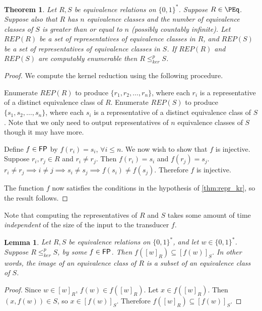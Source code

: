 \documentclass{article}
\newtheorem{theorem}{Theorem}[section]
\newtheorem{lemma}[lemma]{Lemma}
\theoremstyle{definition} \newtheorem{definition}[definition]{Definition}
\newcommand{\sigmastar}{\{0, 1\}^{*}} %
\newcommand{\kr}{\leq^{p}_{ker}} %
\begin{document}
\begin{theorem}\label{thm:reps}
  Let $R,S$ be equivalence relations on $\sigmastar$. Suppose
  $R\in\PEq$. Suppose also that $R$ has $n$ equivalence classes and the number
  of equivalence classes of $S$ is greater than or equal to $n$ (possibly
  countably infinite). Let $REP(R)$ be a set of representatives of equivalence
  classes in $R$, and $REP(S)$ be a set of representatives of equivalence
  classes in $S$. If $REP(R)$ and $REP(S)$ are computably enumerable then $R\kr
  S$.
\end{theorem}
\begin{proof}
  We compute the kernel reduction using the following procedure.

  Enumerate $REP(R)$ to produce $\{r_1, r_2, \ldots, r_n\}$, where each $r_i$
  is a representative of a distinct equivalence class of $R$. Enumerate
  $REP(S)$ to produce $\{s_1, s_2, \ldots, s_n\}$, where each $s_i$ is a
  representative of a distinct equivalence class of $S$. Note that we only need
  to output representatives of $n$ equivalence classes of $S$ though it may
  have more.

  Define $f\in{\ensuremath{\mathsf{FP}}}$ by $f(r_i)=s_i$, $\forall i\leq n$. We now wish to show that
  $f$ is injective. Suppose $r_i,r_j\in R$ and $r_i\neq r_j$. Then $f(r_i)=s_i$
  and $f(r_j)=s_j$. $r_i\neq r_j\implies i\neq j\implies s_i\neq s_j\implies
  f(s_i)\neq f(s_j)$. Therefore $f$ is injective.

  The function $f$ now satisfies the conditions in the hypothesis of
  \autoref{thm:repr_kr}, so the result follows.
\end{proof}

Note that computing the representatives of $R$ and $S$ takes some amount of
time \emph{independent} of the size of the input to the transducer $f$.

\begin{lemma}\label{lem:image}
  Let $R,S$ be equivalence relations on $\sigmastar$, and let
  $w\in\sigmastar$. Suppose $R\kr S$, by some $f\in{\ensuremath{\mathsf{FP}}}$. Then
  $f([w]_R)\subseteq [f(w)]_S$. In other words, the image of an equivalence
  class of $R$ is a subset of an equivalence class of $S$.
\end{lemma}
\begin{proof}
  Since $w\in [w]_R$, $f(w)\in f([w]_R)$. Let $x\in f([w]_R)$. Then $(x,
  f(w))\in S$, so $x\in [f(w)]_S$. Therefore $f([w]_R)\subseteq [f(w)]_S$.
\end{proof}
\end{document}

